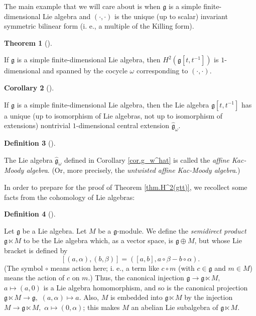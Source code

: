 \documentclass
[numbers=enddot,12pt,final,onecolumn,german,notitlepage]{scrartcl}%
\theoremstyle{definition}
\newtheorem{theo}{Theorem}
\newenvironment{theorem}[1][]
{\begin{theo}[#1]\begin{leftbar}}
{\end{leftbar}\end{theo}}
\newtheorem{defi}[theo]{Definition}
\newenvironment{definition}[1][]
{\begin{defi}[#1]\begin{leftbar}}
{\end{leftbar}\end{defi}}
\newtheorem{coro}[theo]{Corollary}
\newenvironment{corollary}[1][]
{\begin{coro}[#1]\begin{leftbar}}
{\end{leftbar}\end{coro}}
\begin{document}
The main example that we will care about is when $\mathfrak{g}$ is a simple
finite-dimensional Lie algebra and $\left(  \cdot,\cdot\right)  $ is the
unique (up to scalar) invariant symmetric bilinear form (i. e., a multiple of
the Killing form).

\begin{theorem}
\label{thm.H^2(gtt)}If $\mathfrak{g}$ is a simple finite-dimensional Lie
algebra, then $H^{2}\left(  \mathfrak{g}\left[  t,t^{-1}\right]  \right)  $ is
$1$-dimensional and spanned by the cocycle $\omega$ corresponding to $\left(
\cdot,\cdot\right)  $.
\end{theorem}

\begin{corollary}
\label{cor.g_w^hat}If $\mathfrak{g}$ is a simple finite-dimensional Lie
algebra, then the Lie algebra $\mathfrak{g}\left[  t,t^{-1}\right]  $ has a
unique (up to isomorphism of Lie algebras, not up to isomorphism of
extensions) nontrivial $1$-dimensional central extension
$\widehat{\mathfrak{g}}_{\omega}$.
\end{corollary}

\begin{definition}
\label{def.kac}The Lie algebra $\widehat{\mathfrak{g}}_{\omega}$ defined in
Corollary \ref{cor.g_w^hat} is called the \textit{affine Kac-Moody algebra}.
(Or, more precisely, the \textit{untwisted affine Kac-Moody algebra}.)
\end{definition}

In order to prepare for the proof of Theorem \ref{thm.H^2(gtt)}, we recollect
some facts from the cohomology of Lie algebras:

\begin{definition}
Let $\mathfrak{g}$ be a Lie algebra. Let $M$ be a $\mathfrak{g}$-module. We
define the \textit{semidirect product} $\mathfrak{g}\ltimes M$ to be the Lie
algebra which, as a vector space, is $\mathfrak{g}\oplus M$, but whose Lie
bracket is defined by%
\[
\left[  \left(  a,\alpha\right)  ,\left(  b,\beta\right)  \right]  =\left(
\left[  a,b\right]  ,a\circ\beta-b\circ\alpha\right)  .
\]
(The symbol $\circ$ means action here; i. e., a term like $c\circ m$ (with
$c\in\mathfrak{g}$ and $m\in M$) means the action of $c$ on $m$.) Thus, the
canonical injection $\mathfrak{g}\rightarrow\mathfrak{g}\ltimes M,$
$a\mapsto\left(  a,0\right)  $ is a Lie algebra homomorphism, and so is the
canonical projection $\mathfrak{g}\ltimes M\rightarrow\mathfrak{g},$ $\left(
a,\alpha\right)  \mapsto a$. Also, $M$ is embedded into $\mathfrak{g}\ltimes
M$ by the injection $M\rightarrow\mathfrak{g}\ltimes M,$ $\alpha\mapsto\left(
0,\alpha\right)  $; this makes $M$ an abelian Lie subalgebra of $\mathfrak{g}%
\ltimes M$.
\end{definition}
\end{document}
